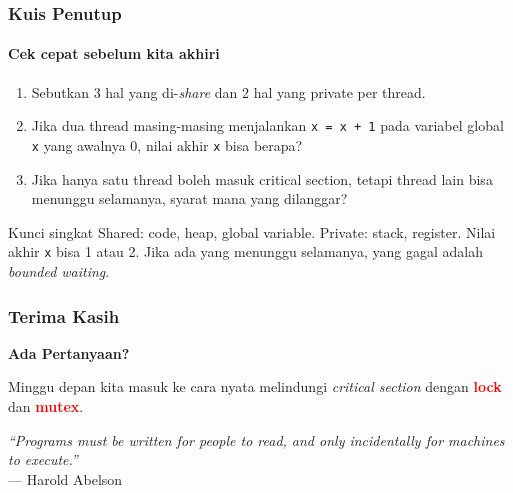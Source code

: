 \documentclass[t,aspectratio=169,xcolor=dvipsnames]{beamer}
\newcommand{\tem}[1]{\textbf{\textcolor{red}{#1}}}
\begin{document}
\begin{frame}
    \frametitle{Kuis Penutup}
    \framesubtitle{Cek cepat sebelum kita akhiri}
    \small

    \begin{enumerate}
        \item Sebutkan 3 hal yang di-\textit{share} dan 2 hal yang private per thread.
        \item Jika dua thread masing-masing menjalankan \texttt{x = x + 1} pada variabel global \texttt{x} yang awalnya 0, nilai akhir \texttt{x} bisa berapa?
        \item Jika hanya satu thread boleh masuk critical section, tetapi thread lain bisa menunggu selamanya, syarat mana yang dilanggar?
    \end{enumerate}

    \vspace{0.3cm}
    \begin{block}{Kunci singkat}
        Shared: code, heap, global variable. Private: stack, register. Nilai akhir \texttt{x} bisa 1 atau 2. Jika ada yang menunggu selamanya, yang gagal adalah \textit{bounded waiting}.
    \end{block}
\end{frame}

\begin{frame}
    \frametitle{Terima Kasih}
    \begin{center}
        \Huge \textbf{Ada Pertanyaan?}

        \vspace{0.8cm}
        \normalsize
        Minggu depan kita masuk ke cara nyata melindungi \textit{critical section} dengan \tem{lock} dan \tem{mutex}.

        \vspace{0.8cm}
        \small
        \textit{``Programs must be written for people to read, and only incidentally for machines to execute.''} \\
        \vspace{0.1cm}
        --- Harold Abelson
    \end{center}
\end{frame}
\end{document}
